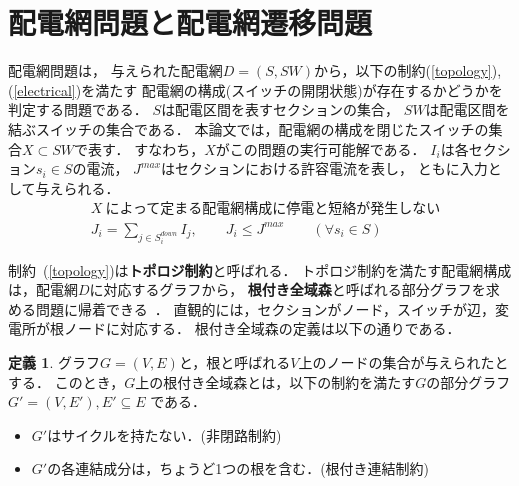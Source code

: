 \section{配電網問題と配電網遷移問題}\label{chap:problem}


配電網問題は，
与えられた配電網$D=(S,SW)$から，以下の制約(\ref{topology}), (\ref{electrical})を満たす
配電網の構成(スイッチの開閉状態)が存在するかどうかを判定する問題である．
$S$は配電区間を表すセクションの集合，
$SW$は配電区間を結ぶスイッチの集合である．
本論文では，配電網の構成を閉じたスイッチの集合$X\subset SW$で表す．
すなわち，$X$がこの問題の実行可能解である．
$I_{i}$は各セクション$s_{i}\in S$の電流，
$J^{max}$はセクションにおける許容電流を表し，
ともに入力として与えられる．
% 
\begin{eqnarray}
& X ~\textrm{によって定まる配電網構成に停電と短絡が発生しない}   \label{topology}\\
& J_i = \displaystyle\sum_{j\in S_i^{down}} I_j, \qquad J_i \leq J^{max}
  \qquad (\forall s_{i}\in S)\label{electrical}
\end{eqnarray}
%

制約~(\ref{topology})は\textbf{トポロジ制約}と呼ばれる．
トポロジ制約を満たす配電網構成は，配電網$D$に対応するグラフから，
\textbf{根付き全域森}と呼ばれる部分グラフを求める問題に帰着できる~\cite{Minato:dnet:netuki}．
直観的には，セクションがノード，スイッチが辺，変電所が根ノードに対応する．
根付き全域森の定義は以下の通りである．

\theoremstyle{definition}
\newtheorem*{definition*}{定義}
\begin{definition*}
  グラフ$G=(V,E)$と，根と呼ばれる$V$上のノードの集合が与えられたとする．
  このとき，$G$上の根付き全域森とは，以下の制約を満たす$G$の部分グラフ
  $G'=(V,E'), E' \subseteq E$ である．
  \begin{itemize}
  \item $G'$はサイクルを持たない．(非閉路制約)
  \item $G'$の各連結成分は，ちょうど1つの根を含む．(根付き連結制約)
  \end{itemize}
\end{definition*}

